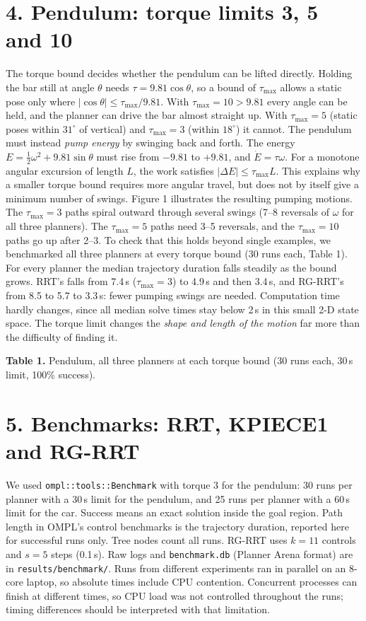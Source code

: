 \documentclass[10pt,letterpaper]{article}
\begin{document}
\section*{4. Pendulum: torque limits 3, 5 and 10}
The torque bound decides whether the pendulum can be lifted directly. Holding the bar still at angle $\theta$ needs
$\tau=9.81\cos\theta$, so a bound of $\tau_{\max}$ allows a static pose only where $|\cos\theta|\le\tau_{\max}/9.81$. With
$\tau_{\max}=10>9.81$ every angle can be held, and the planner can drive the bar almost straight up. With $\tau_{\max}=5$
(static poses within $31^\circ$ of vertical) and $\tau_{\max}=3$ (within $18^\circ$) it cannot. The pendulum must instead
\emph{pump energy} by swinging back and forth. The energy $E=\tfrac12\omega^2+9.81\sin\theta$ must rise from $-9.81$ to $+9.81$, and
$\dot E=\tau\omega$. For a monotone angular excursion of length $L$, the work satisfies $|\Delta E|\le\tau_{\max}L$.
This explains why a smaller torque bound requires more angular travel, but does not by itself give a minimum number of swings.
Figure 1 illustrates the resulting pumping motions. The $\tau_{\max}=3$ paths spiral outward
through several swings (7--8 reversals of $\omega$ for all three planners). The $\tau_{\max}=5$ paths need 3--5 reversals, and
the $\tau_{\max}=10$ paths go up after 2--3. To check that this holds beyond single examples, we benchmarked all three
planners at every torque bound (30 runs each, Table 1). For every planner the median trajectory duration falls steadily as
the bound grows. RRT's falls from 7.4\,s ($\tau_{\max}=3$) to 4.9\,s and then 3.4\,s, and RG-RRT's from 8.5 to 5.7 to 3.3\,s:
fewer pumping swings are needed. Computation time hardly changes, since all
median solve times stay below 2\,s in this small 2-D state space. The torque limit changes the \emph{shape and length of the
motion} far more than the difficulty of finding it.

\begin{center}
{\small\textbf{Table 1.} Pendulum, all three planners at each torque bound (30 runs each, 30\,s limit, 100\% success).}\\[2pt]
\small
\end{center}

\section*{5. Benchmarks: RRT, KPIECE1 and RG-RRT}
We used \texttt{ompl::tools::Benchmark} with torque 3 for the pendulum: 30 runs per planner with a 30\,s limit for the
pendulum, and 25 runs per planner with a 60\,s limit for the car. Success means an exact solution inside the goal region.
Path length in OMPL's control benchmarks is the trajectory duration, reported here for successful runs only. Tree nodes
count all runs. RG-RRT uses $k=11$ controls and $s=5$ steps (0.1\,s). Raw logs and \texttt{benchmark.db} (Planner Arena
format) are in \texttt{results/benchmark/}. Runs from different experiments ran in parallel on an 8-core laptop, so
absolute times include CPU contention. Concurrent processes can finish at different times, so CPU load was not controlled
throughout the runs; timing differences should be interpreted with that limitation.
\end{document}

